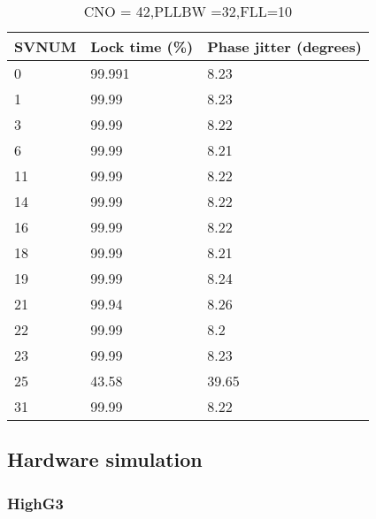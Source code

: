 \begin{table}[!htb]
\centering
\begin{tabular}{|l|l|l|}
\hline
\rowcolor[HTML]{C0C0C0} 
SVNUM & Lock time (\%) & Phase jitter (degrees) \\ \hline
0     & 99.991  & 8.23         \\ \hline
\rowcolor[HTML]{EFEFEF} 
1     & 99.99  & 8.23        \\ \hline
3     & 99.99  & 8.22          \\ \hline
\rowcolor[HTML]{EFEFEF} 
6     & 99.99  & 8.21         \\ \hline
11    & 99.99  & 8.22         \\ \hline
\rowcolor[HTML]{EFEFEF} 
14    & 99.99  & 8.22         \\ \hline
16    & 99.99  & 8.22           \\ \hline
\rowcolor[HTML]{EFEFEF} 
18    & 99.99  & 8.21          \\ \hline
19    & 99.99  & 8.24          \\ \hline
\rowcolor[HTML]{EFEFEF} 
21    & 99.94  & 8.26          \\ \hline
22    & 99.99  & 8.2          \\ \hline
\rowcolor[HTML]{EFEFEF} 
23    & 99.99  & 8.23         \\ \hline
25    & 43.58  & 39.65          \\ \hline
\rowcolor[HTML]{EFEFEF} 
31    & 99.99  & 8.22         \\ \hline
\end{tabular}
\caption{CNO = 42,PLLBW =32,FLL=10}
\label{my-label}
\end{table}

\clearpage
\subsection{Hardware simulation}

\subsubsection{HighG3}

